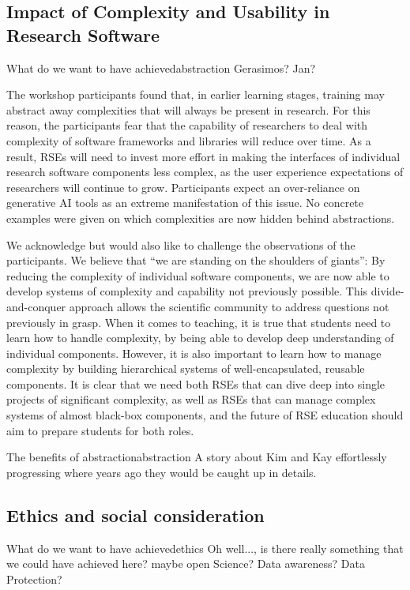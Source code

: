 \documentclass{eceasst}
\begin{document}
\subsection{Impact of Complexity and Usability in Research Software}
\begin{whatis}{What do we want to have achieved}{abstraction}
Gerasimos? Jan?
\end{whatis}

The workshop participants found that, in earlier learning stages,
training may abstract away complexities that will always be present in research.
For this reason, the participants fear that the capability of researchers to deal with complexity
of software frameworks and libraries will reduce over time.
As a result, RSEs will need to invest more effort in making the interfaces of individual research software components
less complex, as the user experience expectations of researchers will continue to grow.
Participants expect an over-reliance on generative AI tools as an extreme manifestation of this issue.
No concrete examples were given on which complexities are now hidden behind abstractions.

We acknowledge but would also like to challenge the observations of the participants.
We believe that ``we are standing on the shoulders of giants'':
By reducing the complexity of individual software components,
we are now able to develop systems of complexity and capability not previously possible.
This divide-and-conquer approach allows the scientific community to address questions not previously in grasp.
When it comes to teaching, it is true that students need to learn how to handle complexity,
by being able to develop deep understanding of individual components.
However, it is also important to learn how to manage complexity
by building hierarchical systems of well-encapsulated, reusable components.
It is clear that we need both RSEs that can dive deep into single projects of significant complexity,
as well as RSEs that can manage complex systems of almost black-box components,
and the future of RSE education should aim to prepare students for both roles.

\begin{story}{The benefits of abstraction}{abstraction}
A story about Kim and Kay effortlessly progressing where years ago they would be caught up in details.
\end{story}

\subsection{Ethics and social consideration}
\begin{whatis}{What do we want to have achieved}{ethics}
Oh well..., is there really something that we could have achieved here?
maybe open Science? Data awareness? Data Protection?
\end{whatis}
\end{document}
